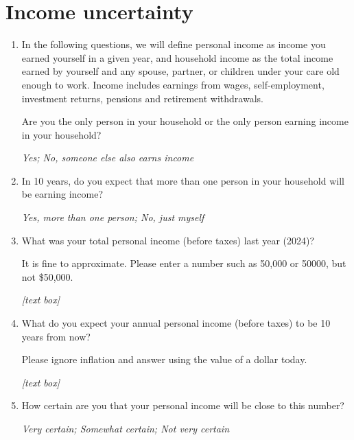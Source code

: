 \documentclass[11pt, headsepline]{article}
\begin{document}
\section*{Income uncertainty}

\begin{enumerate}[resume]

    \item In the following questions, we will define personal income as income you earned yourself in a given year, and household income as the total income earned by yourself and any spouse, partner, or children under your care old enough to work. Income includes earnings from wages, self-employment, investment returns, pensions and retirement withdrawals.
    
    Are you the only person in your household or the only person earning income in your household?

    \textit{Yes; No, someone else also earns income}

    \item In 10 years, do you expect that more than one person in your household will be earning income? 

    \textit{Yes, more than one person; No, just myself}

    \item What was your total personal income (before taxes) last year (2024)?

    It is fine to approximate. Please enter a number such as 50,000 or 50000, but not \$50,000.

    \textit{[text box]}


    \item What do you expect your annual personal income (before taxes) to be 10 years from now?

    Please ignore inflation and answer using the value of a dollar today.

    \textit{[text box]}


    \item How certain are you that your personal income will be close to this number?

    \textit{Very certain; Somewhat certain; Not very certain}


\end{enumerate}
\end{document}
